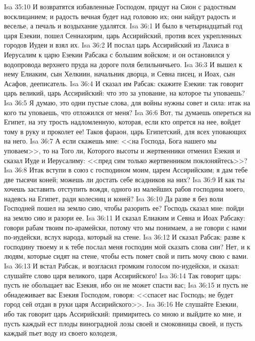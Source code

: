 \vs Isa 35:10 И возвратятся избавленные Господом, придут на Сион с радостным восклицанием; и радость вечная будет над головою их; они найдут радость и веселье, а печаль и воздыхание удалятся.
\vs Isa 36:1 И было в четырнадцатый год царя Езекии, пошел Сеннахирим, царь Ассирийский, против всех укрепленных городов Иудеи и взял их.
\vs Isa 36:2 И послал царь Ассирийский из Лахиса в Иерусалим к царю Езекии Рабсака с большим войском; и он остановился у водопровода верхнего пруда на дороге поля белильничьего.
\vs Isa 36:3 И вышел к нему Елиаким, сын Хелкиин, начальник дворца, и Севна писец, и Иоах, сын Асафов, дееписатель.
\vs Isa 36:4 И сказал им Рабсак: скажите Езекии: так говорит царь великий, царь Ассирийский: что это за упование, на которое ты уповаешь?
\vs Isa 36:5 Я думаю,  это одни пустые слова,  для войны нужны совет и сила: итак на кого ты уповаешь, что отложился от меня?
\vs Isa 36:6 Вот, ты думаешь опереться на Египет, на эту трость надломленную, которая, если кто опрется на нее, войдет тому в руку и проколет ее! Таков фараон, царь Египетский, для всех уповающих на него.
\vs Isa 36:7 А если скажешь мне: <<на Господа, Бога нашего мы уповаем>>, то на Того ли, Которого высоты и жертвенники отменил Езекия и сказал Иуде и Иерусалиму: <<пред сим только жертвенником поклоняйтесь>>?
\vs Isa 36:8 Итак вступи в союз с господином моим, царем Ассирийским; я дам тебе две тысячи коней; можешь ли достать себе всадников на них?
\vs Isa 36:9 И как ты хочешь заставить отступить вождя, одного из малейших рабов господина моего, надеясь на Египет, ради колесниц и коней?
\vs Isa 36:10 Да разве я без воли Господней пошел на землю сию, чтобы разорить ее? Господь сказал мне: пойди на землю сию и разори ее.
\rsbpar\vs Isa 36:11 И сказал Елиаким и Севна и Иоах Рабсаку: говори рабам твоим по-арамейски, потому что мы понимаем, а не говори с нами по-иудейски, вслух народа, который на стене.
\vs Isa 36:12 И сказал Рабсак: разве  к господину твоему и к тебе послал меня господин мой сказать слова сии? Нет,  и к людям, которые сидят на стене, чтобы есть помет свой и пить мочу свою с вами.
\vs Isa 36:13 И встал Рабсак, и возгласил громким голосом по-иудейски, и сказал: слушайте слово царя великого, царя Ассирийского!
\vs Isa 36:14 Так говорит царь: пусть не обольщает вас Езекия, ибо он не может спасти вас;
\vs Isa 36:15 и пусть не обнадеживает вас Езекия Господом, говоря: <<спасет нас Господь; не будет город сей отдан в руки царя Ассирийского>>.
\vs Isa 36:16 Не слушайте Езекии, ибо так говорит царь Ассирийский: примиритесь со мною и выйдите ко мне, и пусть каждый ест плоды виноградной лозы своей и смоковницы своей, и пусть каждый пьет воду из своего колодезя,
